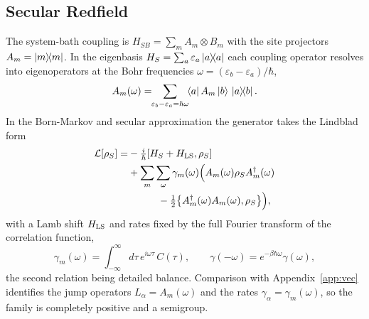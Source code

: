 \documentclass[aps,pra,twocolumn,superscriptaddress,nofootinbib,longbibliography]{revtex4-2}
\newcommand{\rhoS}{\rho_{S}}
\newcommand{\Ldt}{\mathcal{L}}
\begin{document}
\subsection{Secular Redfield}
The system-bath coupling is $H_{SB}=\sum_m A_m\otimes B_m$ with the site
projectors $A_m=\dyad{m}$. In the eigenbasis $H_S=\sum_a\varepsilon_a\dyad{a}$
each coupling operator resolves into eigenoperators at the Bohr frequencies
$\omega=(\varepsilon_b-\varepsilon_a)/\hbar$,
\begin{equation}
  \label{eq:eigenop}
  A_m(\omega)=\!\!\sum_{\varepsilon_b-\varepsilon_a=\hbar\omega}\!\!\bra{a}A_m\ket{b}\,\dyad{a}{b}.
\end{equation}
In the Born-Markov and secular approximation the generator takes the Lindblad
form~\cite{breuer2002}
\begin{equation}
  \label{eq:redfield}
  \begin{split}
  \Ldt[\rhoS]=&-\tfrac{i}{\hbar}[H_S+H_{\rm LS},\rhoS]\\
  &+\sum_m\sum_\omega\gamma_m(\omega)\Big(A_m(\omega)\rhoS A_m^\dagger(\omega)\\
  &\qquad\quad-\tfrac12\big\{A_m^\dagger(\omega)A_m(\omega),\rhoS\big\}\Big),
  \end{split}
\end{equation}
with a Lamb shift $H_{\rm LS}$ and rates fixed by the full Fourier transform of
the correlation function,
\begin{equation}
  \label{eq:rate}
  \gamma_m(\omega)=\int_{-\infty}^{\infty}\!d\tau\,e^{i\omega\tau}\,C(\tau),
  \qquad \gamma(-\omega)=e^{-\beta\hbar\omega}\gamma(\omega),
\end{equation}
the second relation being detailed balance. Comparison with
Appendix~\ref{app:vec} identifies the jump operators $L_\alpha=A_m(\omega)$ and
the rates $\gamma_\alpha=\gamma_m(\omega)$, so the family is completely positive
and a semigroup.
\end{document}
